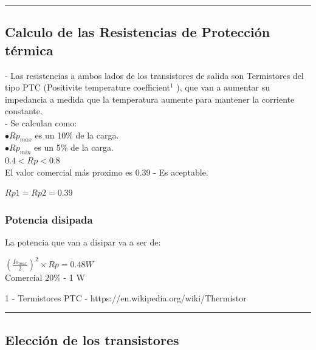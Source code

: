 \documentclass[12pt,a4paper]{report}
\begin{document}
\begin{flushleft}
\vfill
\textcolor{red}{\rule{15cm}{0.2mm}}\par \vspace{0.5cm}
\newpage

\subsection{Calculo de las Resistencias de Protección térmica}
- Las resistencias a ambos lados de los transistores de salida son Termistores del tipo PTC (Positivite temperature coefficient$^1 $ ), que van a aumentar su impedancia a medida que la temperatura aumente para mantener la corriente constante.\\
\vspace{0.2cm}
- Se calculan como:\\
\hspace{0.5cm} $\bullet Rp_{max}$ es un 10\% de la carga.\\
\hspace{0.5cm} $\bullet Rp_{min}$ es un 5\% de la carga.\\
\vspace{0.4cm}
$ \boxed{ 0.4 < Rp < 0.8 } $ \\
\vspace{0.4cm}
El valor comercial más proximo es 0.39 - Es aceptable.
\begin{center}
$ \boxed{ Rp1 = Rp2 = 0.39 } $ \\
\end{center}

\subsubsection{Potencia disipada}

La potencia que van a disipar va a ser de:
\begin{center}
$ \boxed{(\frac{Io_{max}}{2})^2 \times Rp = 0.48W } $ \\
Comercial 20\% - 1 W
\end{center}

1 - Termistores PTC - https://en.wikipedia.org/wiki/Thermistor

\vfill
\textcolor{red}{\rule{15cm}{0.2mm}}\par \vspace{0.5cm}
\newpage

\subsection{Elección de los transistores}

\end{flushleft}
\end{document}

